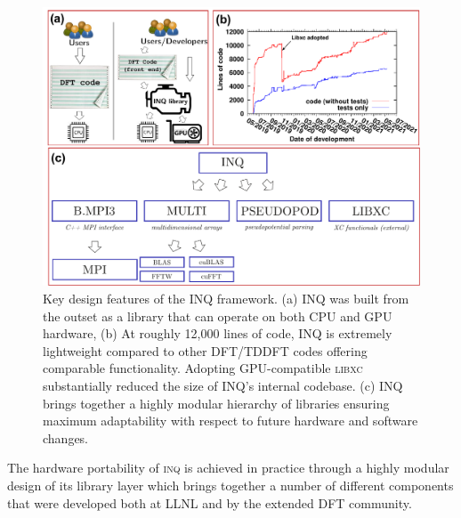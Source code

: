 \begin{figure}[h]
	\centering
	\includegraphics[width=1.0\linewidth]{figures/INQ_design_features.pdf}
	\caption{
		Key design features of the INQ framework.
		(a) INQ was built from the outset as a library that can operate on both CPU and GPU hardware,
		(b) At roughly 12,000 lines of code, INQ is extremely lightweight compared to other DFT/TDDFT codes offering comparable functionality.
		Adopting GPU-compatible \textsc{libxc} substantially reduced the size of INQ's internal codebase.
		(c) INQ brings together a highly modular hierarchy of libraries ensuring maximum adaptability with respect to future hardware and software changes.
	}
	\label{fig:inq_design}
\end{figure}

The hardware portability of \textsc{inq} is achieved in practice through a highly modular design of its library layer which brings together a number of different components that were developed both at LLNL and by the extended DFT community. 

